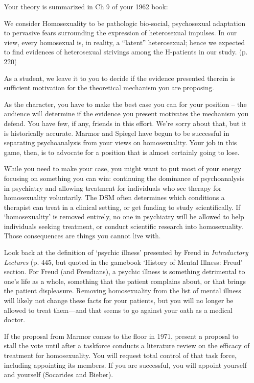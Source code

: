 \begin{refsection}
Your theory is summarized in Ch 9 of your 1962 book:

We consider Homosexuality to be pathologic bio-social, psychosexual adaptation to pervasive fears surrounding the expression of heterosexual impulses. In our view, every homosexual is, in reality, a “latent” heterosexual; hence we expected to find evidences of heterosexual strivings among the H-patients in our study. (p. 220)

As a student, we leave it to you to decide if the evidence presented therein is sufficient motivation for the theoretical mechanism you are proposing.

As the character, you have to make the best case you can for your position – the audience will determine if the evidence you present motivates the mechanism you defend. You have few, if any, friends in this effort. We're sorry about that, but it is historically accurate. Marmor and Spiegel have begun to be successful in separating psychoanalysis from your views on homosexuality. Your job in this game, then, is to advocate for a position that is almost certainly going to lose. 

While you need to make your case, you might want to put most of your energy focusing on something you can win: continuing the dominance of psychoanalysis in psychiatry and allowing treatment for individuals who see therapy for homosexuality voluntarily. The DSM often determines which conditions a therapist can treat in a clinical setting, or get funding to study scientifically. If `homosexuality' is removed entirely, no one in psychiatry will be allowed to help individuals seeking treatment, or conduct scientific research into homosexuality. Those consequences are things you cannot live with. 

Look back at the definition of `psychic illness' presented by Freud in \emph{Introductory Lectures} (p. 445, but quoted in the gamebook `History of Mental Illness: Freud' section. For Freud (and Freudians), a psychic illness is something detrimental to one's life as a whole, something that the patient complains about, or that brings the patient displeasure. Removing homosexuality from the list of mental illness will likely not change these facts for your patients, but you will no longer be allowed to treat them—and that seems to go against your oath as a medical doctor.

If the proposal from Marmor comes to the floor in 1971, present a proposal to stall the vote until after a taskforce conducts a literature review on the efficacy of treatment for homosexuality. You will request total control of that task force, including appointing its members. If you are successful, you will appoint yourself and yourself (Socarides and Bieber). 


\end{refsection}

